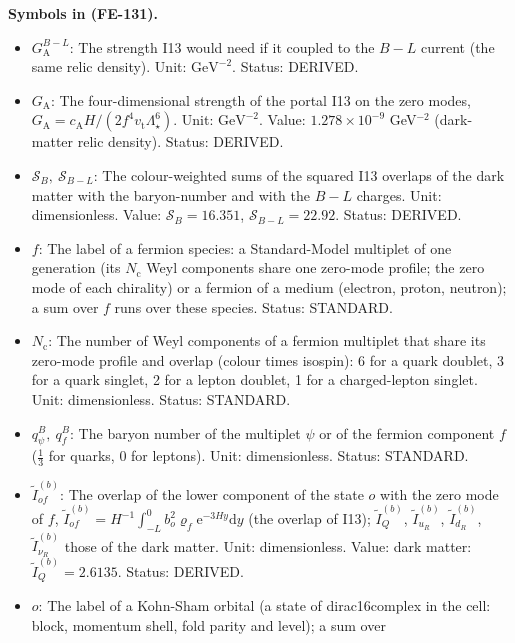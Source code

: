 \documentclass[
  10pt,
]{article}
\providecommand{\tightlist}{%
  \setlength{\itemsep}{0pt}\setlength{\parskip}{0pt}}
\begin{document}
\textbf{Symbols in (FE-131).}

\begin{itemize}
\tightlist
\item
  \(G_{\mathrm{A}}^{B-L}\): The strength I13 would need if it coupled to
  the \(B - L\) current (the same relic density). Unit:
  \(\mathrm{GeV}^{-2}\). Status: DERIVED.
\item
  \(G_{\mathrm{A}}\): The four-dimensional strength of the portal I13 on
  the zero modes,
  \(G_{\mathrm{A}} = c_{\mathrm{A}}H/(2f^4v_{\mathrm{t}}\Lambda_\star^6)\).
  Unit: \(\mathrm{GeV}^{-2}\). Value: \(1.278\times10^{-9}\)
  GeV\(^{-2}\) (dark-matter relic density). Status: DERIVED.
\item
  \(\mathcal{S}_B,\ \mathcal{S}_{B-L}\): The colour-weighted sums of the
  squared I13 overlaps of the dark matter with the baryon-number and
  with the \(B - L\) charges. Unit: dimensionless. Value:
  \(\mathcal{S}_B = 16.351\), \(\mathcal{S}_{B-L} = 22.92\). Status:
  DERIVED.
\item
  \(f\): The label of a fermion species: a Standard-Model multiplet of
  one generation (its \(N_{\mathrm{c}}\) Weyl components share one
  zero-mode profile; the zero mode of each chirality) or a fermion of a
  medium (electron, proton, neutron); a sum over \(f\) runs over these
  species. Status: STANDARD.
\item
  \(N_{\mathrm{c}}\): The number of Weyl components of a fermion
  multiplet that share its zero-mode profile and overlap (colour times
  isospin): 6 for a quark doublet, 3 for a quark singlet, 2 for a lepton
  doublet, 1 for a charged-lepton singlet. Unit: dimensionless. Status:
  STANDARD.
\item
  \(q^B_\psi,\ q^B_f\): The baryon number of the multiplet \(\psi\) or
  of the fermion component \(f\) (\(\frac13\) for quarks, 0 for
  leptons). Unit: dimensionless. Status: STANDARD.
\item
  \(\tilde I^{(b)}_{of}\): The overlap of the lower component of the
  state \(o\) with the zero mode of \(f\),
  \(\tilde I^{(b)}_{of} = H^{-1}\int_{-L}^{0}b_o^2\varrho_f\mathrm{e}^{-3Hy}\mathrm{d}y\)
  (the overlap of I13); \(\tilde I^{(b)}_Q\), \(\tilde I^{(b)}_{u_R}\),
  \(\tilde I^{(b)}_{d_R}\), \(\tilde I^{(b)}_{\nu_R}\) those of the dark
  matter. Unit: dimensionless. Value: dark matter:
  \(\tilde I^{(b)}_Q = 2.6135\). Status: DERIVED.
\item
  \(o\): The label of a Kohn-Sham orbital (a state of dirac16complex in
  the cell: block, momentum shell, fold parity and level); a sum over

\end{itemize}
\end{document}
